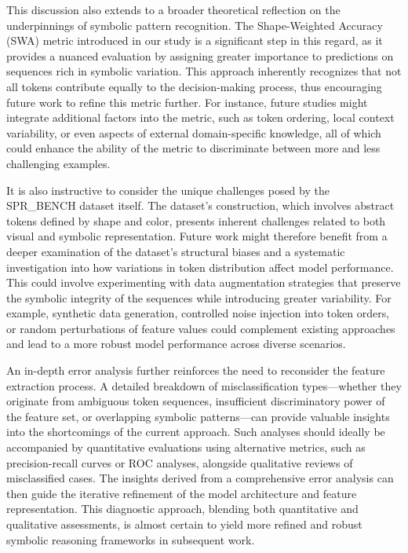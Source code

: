 \documentclass{article}
\begin{document}
This discussion also extends to a broader theoretical reflection on the underpinnings of symbolic pattern recognition. The Shape-Weighted Accuracy (SWA) metric introduced in our study is a significant step in this regard, as it provides a nuanced evaluation by assigning greater importance to predictions on sequences rich in symbolic variation. This approach inherently recognizes that not all tokens contribute equally to the decision-making process, thus encouraging future work to refine this metric further. For instance, future studies might integrate additional factors into the metric, such as token ordering, local context variability, or even aspects of external domain-specific knowledge, all of which could enhance the ability of the metric to discriminate between more and less challenging examples.

It is also instructive to consider the unique challenges posed by the SPR_BENCH dataset itself. The dataset’s construction, which involves abstract tokens defined by shape and color, presents inherent challenges related to both visual and symbolic representation. Future work might therefore benefit from a deeper examination of the dataset’s structural biases and a systematic investigation into how variations in token distribution affect model performance. This could involve experimenting with data augmentation strategies that preserve the symbolic integrity of the sequences while introducing greater variability. For example, synthetic data generation, controlled noise injection into token orders, or random perturbations of feature values could complement existing approaches and lead to a more robust model performance across diverse scenarios.

An in-depth error analysis further reinforces the need to reconsider the feature extraction process. A detailed breakdown of misclassification types—whether they originate from ambiguous token sequences, insufficient discriminatory power of the feature set, or overlapping symbolic patterns—can provide valuable insights into the shortcomings of the current approach. Such analyses should ideally be accompanied by quantitative evaluations using alternative metrics, such as precision-recall curves or ROC analyses, alongside qualitative reviews of misclassified cases. The insights derived from a comprehensive error analysis can then guide the iterative refinement of the model architecture and feature representation. This diagnostic approach, blending both quantitative and qualitative assessments, is almost certain to yield more refined and robust symbolic reasoning frameworks in subsequent work.
\end{document}
